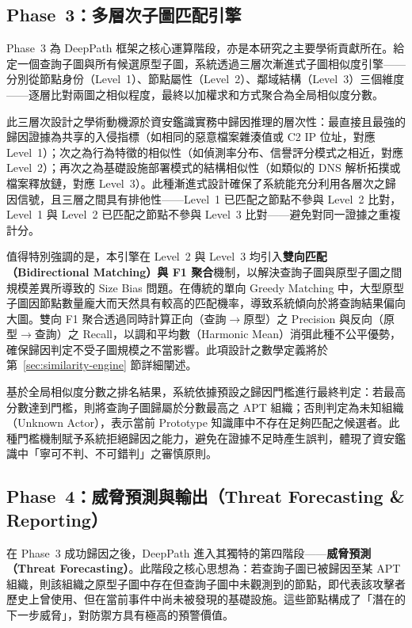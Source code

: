 \begin{ZhChapter}
\subsection{Phase~3：多層次子圖匹配引擎}
\label{subsec:phase3-overview}

Phase~3 為 DeepPath 框架之核心運算階段，亦是本研究之主要學術貢獻所在。給定一個查詢子圖與所有候選原型子圖，系統透過三層次漸進式子圖相似度引擎——分別從節點身份（Level~1）、節點屬性（Level~2）、鄰域結構（Level~3）三個維度——逐層比對兩圖之相似程度，最終以加權求和方式聚合為全局相似度分數。

此三層次設計之學術動機源於資安鑑識實務中歸因推理的層次性：最直接且最強的歸因證據為共享的入侵指標（如相同的惡意檔案雜湊值或 C2 IP 位址，對應 Level~1）；次之為行為特徵的相似性（如偵測率分布、信譽評分模式之相近，對應 Level~2）；再次之為基礎設施部署模式的結構相似性（如類似的 DNS 解析拓撲或檔案釋放鏈，對應 Level~3）。此種漸進式設計確保了系統能充分利用各層次之歸因信號，且三層之間具有排他性——Level~1 已匹配之節點不參與 Level~2 比對，Level~1 與 Level~2 已匹配之節點不參與 Level~3 比對——避免對同一證據之重複計分。

值得特別強調的是，本引擎在 Level~2 與 Level~3 均引入\textbf{雙向匹配（Bidirectional Matching）與 F1 聚合}機制，以解決查詢子圖與原型子圖之間規模差異所導致的 Size Bias 問題。在傳統的單向 Greedy Matching 中，大型原型子圖因節點數量龐大而天然具有較高的匹配機率，導致系統傾向於將查詢結果偏向大圖。雙向 F1 聚合透過同時計算正向（查詢$\rightarrow$原型）之 Precision 與反向（原型$\rightarrow$查詢）之 Recall，以調和平均數（Harmonic Mean）消弭此種不公平優勢，確保歸因判定不受子圖規模之不當影響。此項設計之數學定義將於第~\ref{sec:similarity-engine} 節詳細闡述。

基於全局相似度分數之排名結果，系統依據預設之歸因門檻進行最終判定：若最高分數達到門檻，則將查詢子圖歸屬於分數最高之 APT 組織；否則判定為未知組織（Unknown Actor），表示當前 Prototype 知識庫中不存在足夠匹配之候選者。此種門檻機制賦予系統拒絕歸因之能力，避免在證據不足時產生誤判，體現了資安鑑識中「寧可不判、不可錯判」之審慎原則。

\subsection{Phase~4：威脅預測與輸出（Threat Forecasting \& Reporting）}
\label{subsec:phase4-overview}

在 Phase~3 成功歸因之後，DeepPath 進入其獨特的第四階段——\textbf{威脅預測（Threat Forecasting）}。此階段之核心思想為：若查詢子圖已被歸因至某 APT 組織，則該組織之原型子圖中存在但查詢子圖中未觀測到的節點，即代表該攻擊者歷史上曾使用、但在當前事件中尚未被發現的基礎設施。這些節點構成了「潛在的下一步威脅」，對防禦方具有極高的預警價值。


\end{ZhChapter}
